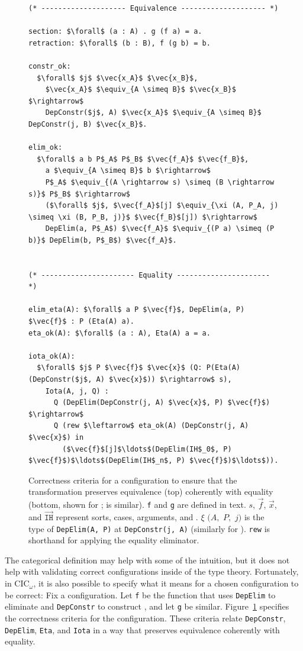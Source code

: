 \begin{figure}
\begin{lstlisting}
(* -------------------- Equivalence -------------------- *)

section: $\forall$ (a : A) . g (f a) = a.
retraction: $\forall$ (b : B), f (g b) = b.

constr_ok:
  $\forall$ $j$ $\vec{x_A}$ $\vec{x_B}$,
    $\vec{x_A}$ $\equiv_{A \simeq B}$ $\vec{x_B}$ $\rightarrow$
    DepConstr($j$, A) $\vec{x_A}$ $\equiv_{A \simeq B}$ DepConstr(j, B) $\vec{x_B}$.

elim_ok:
  $\forall$ a b P$_A$ P$_B$ $\vec{f_A}$ $\vec{f_B}$,
    a $\equiv_{A \simeq B}$ b $\rightarrow$
    P$_A$ $\equiv_{(A \rightarrow s) \simeq (B \rightarrow s)}$ P$_B$ $\rightarrow$
    ($\forall$ $j$, $\vec{f_A}$[j] $\equiv_{\xi (A, P_A, j) \simeq \xi (B, P_B, j)}$ $\vec{f_B}$[j]) $\rightarrow$
    DepElim(a, P$_A$) $\vec{f_A}$ $\equiv_{(P a) \simeq (P b)}$ DepElim(b, P$_B$) $\vec{f_A}$.


(* ---------------------- Equality ---------------------- *)

elim_eta(A): $\forall$ a P $\vec{f}$, DepElim(a, P) $\vec{f}$ : P (Eta(A) a).
eta_ok(A): $\forall$ (a : A), Eta(A) a = a.

iota_ok(A):
  $\forall$ $j$ P $\vec{f}$ $\vec{x}$ (Q: P(Eta(A) (DepConstr($j$, A) $\vec{x}$)) $\rightarrow$ s),
    Iota(A, j, Q) : 
      Q (DepElim(DepConstr(j, A) $\vec{x}$, P) $\vec{f}$) $\rightarrow$ 
      Q (rew $\leftarrow$ eta_ok(A) (DepConstr(j, A) $\vec{x}$) in 
        ($\vec{f}$[j]$\ldots$(DepElim(IH$_0$, P) $\vec{f}$)$\ldots$(DepElim(IH$_n$, P) $\vec{f}$)$\ldots$)).
\end{lstlisting}
\caption{Correctness criteria for a configuration to ensure that the transformation
preserves equivalence (top) coherently with equality (bottom, shown for \Aa; \B is similar). \lstinline{f} and \lstinline{g} are defined in text. $s$, $\vec{f}$, $\vec{x}$, and $\vec{\mathtt{IH}}$ represent
sorts,  cases,  arguments, and . $\xi$ $(A,$ $P,$ $j)$ is the type 
of \lstinline{DepElim(A, P)} at \lstinline{DepConstr(j, A)} (similarly for \B).
\lstinline{rew} is shorthand for applying the equality eliminator.} %
\label{fig:spec}
\end{figure}

The categorical definition may help with some of the intuition, but it does not help with validating correct configurations inside of the type theory.
Fortunately, in CIC$_{\omega}$, it is also possible to specify 
what it means for a chosen configuration to be correct:
Fix a configuration. Let \lstinline{f} be the function that uses \lstinline{DepElim} to eliminate \Aa and \lstinline{DepConstr} to construct \B,
and let \lstinline{g} be similar.
Figure~\ref{fig:spec} specifies the correctness criteria for the configuration.
These criteria relate \lstinline{DepConstr}, \lstinline{DepElim}, \lstinline{Eta}, and \lstinline{Iota}
in a way that preserves equivalence coherently with equality.

